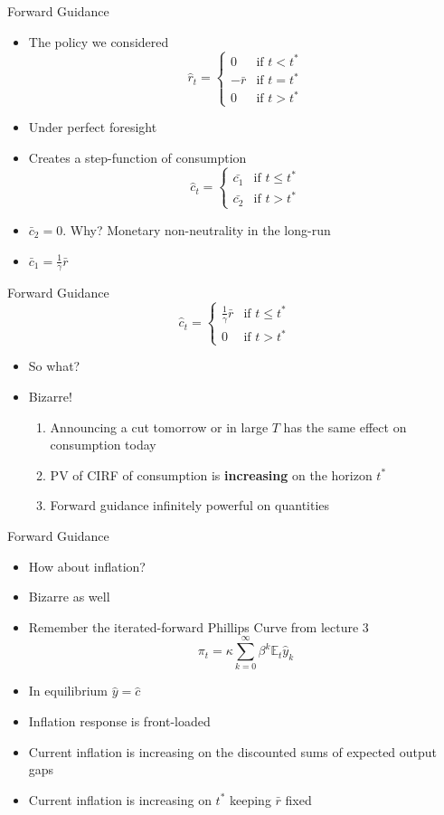 \documentclass[english,xcolor=svgnames]{beamer}
\begin{document}
\begin{frame}{Forward Guidance}
\begin{itemize}
\item The policy we considered
\[
\hat{r}_t = 
\begin{cases}
0 & \text{if $t < t^*$} \\
-\bar{r}& \text{if  $t = t^*$}\\
0 & \text{if $t > t^*$}
\end{cases}
\]

\item Under perfect foresight
\item Creates a step-function of consumption
\[
\hat{c}_t = 
\begin{cases}
\bar{c_1} & \text{if $t \leq t^*$} \\
\bar{c_2} & \text{if $t > t^*$}
\end{cases}
\]
\item $\bar{c}_2 = 0$. Why? Monetary non-neutrality in the long-run
\item $\bar{c}_1 = \frac{1}{\gamma} \bar{r}$
\end{itemize}
\end{frame}

\begin{frame}{Forward Guidance}
\[
\hat{c}_t = 
\begin{cases}
 \frac{1}{\gamma} \bar{r} & \text{if $t \leq t^*$} \\
0 & \text{if $t > t^*$}
\end{cases}
\]
\begin{itemize}
\item So what?
\item Bizarre!
\begin{enumerate}
\item Announcing a cut tomorrow or in large $T$  has the same effect on consumption today
\item PV of CIRF of consumption is \textbf{increasing} on the horizon $t^*$
\item Forward guidance infinitely powerful on quantities
\end{enumerate}
\end{itemize}
\end{frame}

\begin{frame}{Forward Guidance}
\begin{itemize}
\item How about inflation?
\item Bizarre as well
\item Remember the iterated-forward Phillips Curve from lecture $3$
\[\pi_t =\kappa \sum_{k=0}^{\infty} \beta^k \mathbb{E}_t \hat{y}_k \]
\item In equilibrium $\hat{y} = \hat{c}$
\item Inflation response is front-loaded
\item Current inflation is increasing on the discounted sums of expected output gaps
\item Current inflation is increasing on $t^*$ keeping $\bar{r}$ fixed
\end{itemize}
\end{frame}
\end{document}
